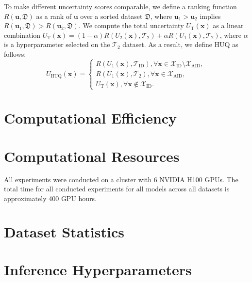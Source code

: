 \documentclass[11pt]{article}
\newcommand{\xv}{\mathbf{x}}
\newcommand{\TC}{\mathcal{T}}
\newcommand{\XSet}{\mathcal{X}}
\newcommand{\uv}{\mathbf{u}}
\begin{document}
  To make different uncertainty scores comparable, we define a ranking function $R(\uv, \mathfrak{D})$ as a rank of $\uv$ over a sorted dataset $\mathfrak{D}$, where $\uv_1 > \uv_2$ implies $R(\uv_1, \mathfrak{D}) > R(\uv_2, \mathfrak{D})$. We compute the total uncertainty $U_{\text{T}}(\xv)$ as a linear combination $U_{\text{T}}(\xv) = \!\!(1 - \alpha) R(U_{\text{2}}(\xv), \TC_2) + \alpha R(U_{\text{1}}(\xv), \TC_2)$, where $\alpha$ is a hyperparameter selected on the $\TC_2$ dataset. As a result, we define HUQ as follows:
  \begin{equation*}
    U_{\text{HUQ}}(\xv)
    = 
    \begin{cases}
      R(U_{\text{1}}(\xv), \TC_{\text{ID}}), \forall \xv \in \XSet_{\text{ID}} \setminus \XSet_{\text{AID}}, \\
      R(U_{\text{1}}(\xv), \TC_2),  \forall \xv \in \XSet_{\text{AID}}, \\
      U_{\text{T}}(\xv), \forall \xv \notin \XSet_{\text{ID}}.
    \end{cases}
  \end{equation*}

\section{Computational Efficiency}
\label{sec:comp_eff}
  

\section{Computational Resources}
  All experiments were conducted on a cluster with 6 NVIDIA H100 GPUs. The total time for all conducted experiments for all models across all datasets is approximately 400 GPU hours.

\section{Dataset Statistics}
\label{sec:datasets}
  

\clearpage
\section{Inference Hyperparameters}
\label{sec:hyperparameters}
  
\end{document}
